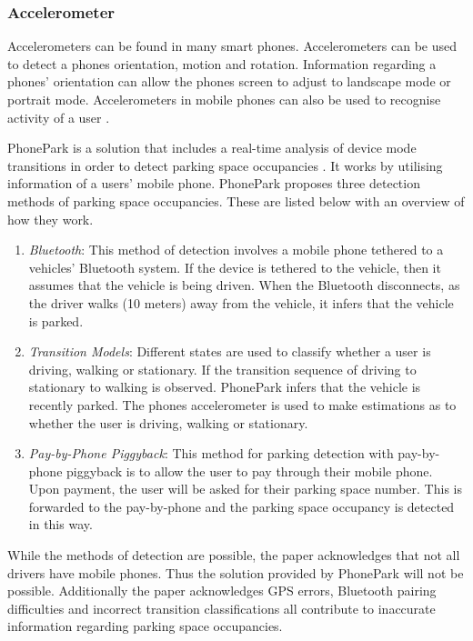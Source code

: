 \subsubsection*{Accelerometer}
Accelerometers can be found in many smart phones. Accelerometers can be used to detect a phones orientation, motion and rotation. Information regarding a phones' orientation can allow the phones screen to adjust to landscape mode or portrait mode. Accelerometers in mobile phones can also be used to recognise activity of a user \citep{Brezmes2009ActivityPhone}.

PhonePark is a solution that includes a real-time analysis of device mode transitions in order to detect parking space occupancies \citep{xu_real-time_2013}. It works by utilising information of a users' mobile phone. PhonePark proposes three detection methods of parking space occupancies. These are listed below with an overview of how they work.

\begin{enumerate}
    \item \textit{Bluetooth}: This method of detection involves a mobile phone tethered to a vehicles' Bluetooth system. If the device is tethered to the vehicle, then it assumes that the vehicle is being driven. When the Bluetooth disconnects, as the driver walks (10 meters) away from the vehicle, it infers that the vehicle is parked. 
    \item \textit{Transition Models}: Different states are used to classify whether a user is driving, walking or stationary. If the transition sequence of driving to stationary to walking is observed. PhonePark infers that the vehicle is recently parked. The phones accelerometer is used to make estimations as to whether the user is driving, walking or stationary.
    \item \textit{Pay-by-Phone Piggyback}: This method for parking detection with pay-by-phone piggyback is to allow the user to pay through their mobile phone. Upon payment, the user will be asked for their parking space number. This is forwarded to the pay-by-phone and the parking space occupancy is detected in this way.
\end{enumerate}

While the methods of detection are possible, the paper acknowledges that not all drivers have mobile phones. Thus the solution provided by PhonePark will not be possible. Additionally the paper acknowledges GPS errors, Bluetooth pairing difficulties and incorrect transition classifications all contribute to inaccurate information regarding parking space occupancies.